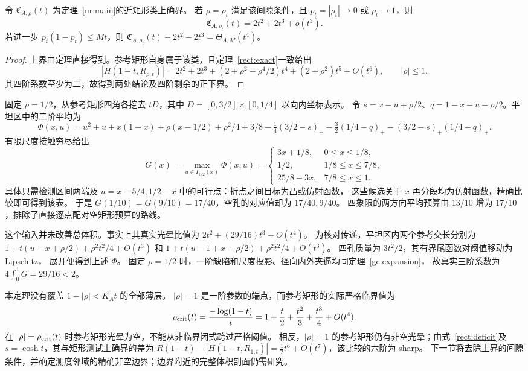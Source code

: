 \begin{corollary}[两端路径上的匹配三阶项]\label{nr:endpoints}
令 $\mathfrak C_{A,\rho}(t)$ 为定理~\ref{nr:main}的近矩形类上确界。
若 $\rho=\rho_t$ 满足该间隙条件，且 $p_t=|\rho_t|\to0$ 或 $p_t\to1$，则
\[
 \mathfrak C_{A,\rho_t}(t)=2t^2+2t^3+o(t^3).
\]
若进一步 $p_t(1-p_t)\le Mt$，则
$\mathfrak C_{A,\rho_t}(t)-2t^2-2t^3=\Theta_{A,M}(t^4)$。
\end{corollary}
\begin{proof}
上界由定理直接得到。参考矩形自身属于该类，且定理~\ref{rect:exact}一致给出
\begin{equation}\label{nr:reference}
 |H(1-t,R_{\rho,t})|
 =2t^2+2t^3+(2+\rho^2-\rho^4/2)t^4+(2+\rho^2)t^5+O(t^6),
 \qquad |\rho|\le1.
\end{equation}
其四阶系数至少为二，故得到两处结论及四阶剩余的正下界。
\end{proof}

\begin{example}[两个对称方向不能独立使用空矩形预算]\label{nr:obstacle}
固定 $\rho=1/2$，从参考矩形四角各挖去
$tD$，其中 $D=[0,3/2]\times[0,1/4]$ 以向内坐标表示。
令 $s=x-u+\rho/2$、$q=1-x-u-\rho/2$。平坦区中的二阶平均为
\[
 \Phi(x,u)=u^2+u+x(1-x)+\rho(x-1/2)+\rho^2/4
 +3/8-\tfrac14(3/2-s)_+-\tfrac32(1/4-q)_+-(3/2-s)_+(1/4-q)_+.
\]
有限尺度接触穷尽给出
\[
 G(x)=\max_{u\in I_{1/2}(x)}\Phi(x,u)=
 \begin{cases}3x+1/8,&0\le x\le1/8,\\1/2,&1/8\le x\le7/8,\\25/8-3x,&7/8\le x\le1.\end{cases}
\]
具体只需检测区间两端及 $u=x-5/4,1/2-x$ 中的可行点：折点之间目标为凸或仿射函数，
这些候选关于 $x$ 再分段均为仿射函数，精确比较即可得到该表。
于是 $G(1/10)=G(9/10)=17/40$，空孔的对应值却为 $17/40,9/40$。
四象限的两方向平均预算由 $13/10$ 增为 $17/10$，排除了直接逐点配对空矩形预算的路线。

这个输入并未改善总体积。事实上其真实光晕比值为
$2t^2+(29/16)t^3+O(t^4)$。
为核对传递，平坦区内两个参考交长分别为
$1+t(u-x+\rho/2)+\rho^2t^2/4+O(t^3)$ 和
$1+t(u-1+x-\rho/2)+\rho^2t^2/4+O(t^3)$。
四孔质量为 $3t^2/2$，其有界尾函数对阈值移动为 Lipschitz，
展开便得到上述 $\Phi$。
固定 $\rho=1/2$ 时，一阶缺陷和尺度投影、径向内外夹逼均同定理~\ref{gc:expansion}，
故真实三阶系数为 $4\int_0^1G=29/16<2$。
\end{example}

\begin{remark}[一阶端点与实际严格阈值]\label{nr:critical}
本定理没有覆盖 $1-|\rho|<K_At$ 的全部薄层。
$|\rho|=1$ 是一阶参数的端点，而参考矩形的实际严格临界值为
\[
 \rho_{\rm crit}(t)=\frac{-\log(1-t)}t
 =1+\frac t2+\frac{t^2}3+\frac{t^3}4+O(t^4).
\]
在 $|\rho|=\rho_{\rm crit}(t)$ 时参考矩形光晕为空，不能从非临界闭式跨过严格阈值。
相反，$|\rho|=1$ 的参考矩形仍有非空光晕；由式~\eqref{rect:deficit}及 $s=\cosh t$，其与矩形测试上确界的差为
$R(1-t)-|H(1-t,R_{1,t})|=\tfrac12t^6+O(t^7)$，该比较的六阶为 sharp。
下一节将去除上界的间隙条件，并确定测度邻域的精确非空边界；边界附近的完整体积剖面仍需研究。
\end{remark}
